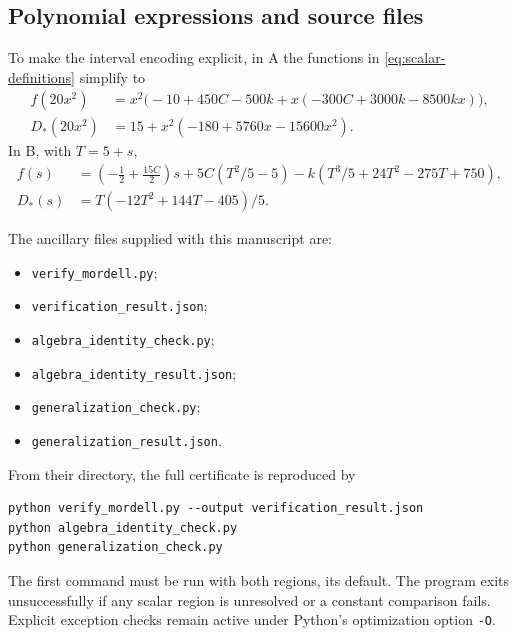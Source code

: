 \documentclass[11pt]{article}
\theoremstyle{remark}
\numberwithin{equation}{section}
\begin{document}
\subsection{Polynomial expressions and source files}
To make the interval encoding explicit, in A the functions in
\eqref{eq:scalar-definitions} simplify to
\begin{equation}\label{eq:branch-A}
\begin{aligned}
 f(20x^2)&=x^2\bigl(-10+450C-500k
             +x(-300C+3000k-8500kx)\bigr),\\
 D_*(20x^2)&=15+x^2(-180+5760x-15600x^2).
\end{aligned}
\end{equation}
In B, with $T=5+s$,
\begin{equation}\label{eq:branch-B}
\begin{aligned}
 f(s)&=\left(-\frac12+\frac{15C}{2}\right)s
       +5C(T^2/5-5)
       -k(T^3/5+24T^2-275T+750),\\
 D_*(s)&=T(-12T^2+144T-405)/5.
\end{aligned}
\end{equation}

\noindent\begin{minipage}{\textwidth}
The ancillary files supplied with this manuscript are:
\begin{itemize}
\item \texttt{verify\_mordell.py};
\item \texttt{verification\_result.json};
\item \texttt{algebra\_identity\_check.py};
\item \texttt{algebra\_identity\_result.json};
\item \texttt{generalization\_check.py};
\item \texttt{generalization\_result.json}.
\end{itemize}
\end{minipage}
From their directory, the full certificate is reproduced by
\begin{verbatim}
python verify_mordell.py --output verification_result.json
python algebra_identity_check.py
python generalization_check.py
\end{verbatim}
The first command must be run with both regions, its default.
The program exits unsuccessfully if any scalar region is unresolved
or a constant comparison fails. Explicit exception checks remain active
under Python's optimization option \texttt{-O}.
\end{document}
